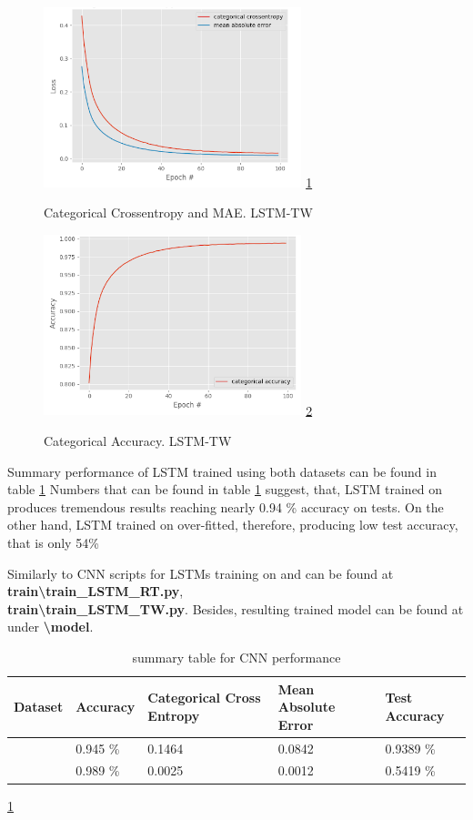 \documentclass[conference]{IEEEtran}
\begin{document}
			\begin{figure}
				\caption{Categorical Crossentropy and MAE. LSTM-TW}
				\centering
				\includegraphics[width=7.5cm]{categorical_crossentropy_mae_lstm-tw.png}
				\label{figure:7}
				\ref{figure:7}
			\end{figure}
			
			\begin{figure}
				\caption{Categorical Accuracy. LSTM-TW}
				\centering
				\includegraphics[width=7.5cm]{categorical_accuracy_lstm-tw.png}
				\label{figure:8}
				\ref{figure:8}
			\end{figure}
		
		Summary performance of LSTM trained using both datasets can be found in table \ref{table:4}
		Numbers that can be found in table \ref{table:4} suggest, that, LSTM trained on \RT produces tremendous results reaching nearly 0.94 \% accuracy on tests. On the other hand, LSTM trained on \TW over-fitted, therefore, producing low test accuracy, that is only 54\% 
		
		Similarly to CNN scripts for LSTMs training on \RT and \TW can be found at \textbf{\\train\textbackslash train\_LSTM\_RT.py}, \textbf{\\train\textbackslash train\_LSTM\_TW.py}. Besides, resulting trained model can be found at \cite{report:repo} under \textbf{\textbackslash model}.
		
		\begin{table}
			\centering
			\begin{tabular}{| m{2cm} | m{1.1cm} | m{1.1cm} | m{1.1cm} |  m{1.1cm} | } 
				\hline
				Dataset & Accuracy & Categorical Cross Entropy & Mean Absolute Error & Test Accuracy\\
				\hline
				\RT & 0.945 \% & 0.1464 & 0.0842 & 0.9389 \% \\ 
				\hline
				\TW & 0.989 \% & 0.0025 & 0.0012 & 0.5419 \% \\ 
				\hline
			\end{tabular}
			\caption{summary table for CNN performance}
			\label{table:4}
			\ref{table:4}
		\end{table}
		
\end{document}
